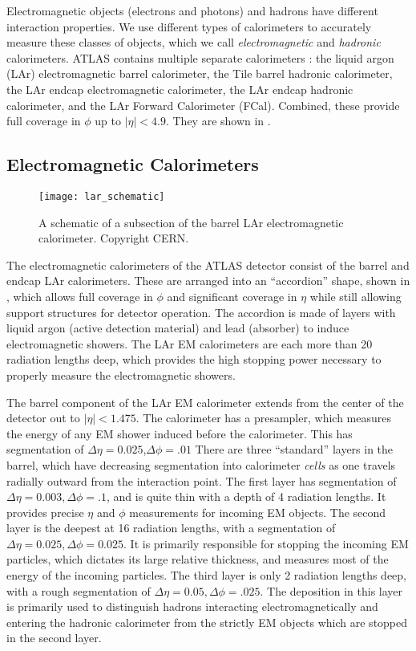 Electromagnetic objects (electrons and photons) and hadrons have different interaction properties.
We use different types of calorimeters to accurately measure these classes of objects, which we call \textit{electromagnetic} and \textit{hadronic} calorimeters.
ATLAS contains multiple separate calorimeters : the liquid argon (LAr) electromagnetic barrel calorimeter, the Tile barrel hadronic calorimeter, the LAr endcap electromagnetic calorimeter, the LAr endcap hadronic calorimeter, and the LAr Forward Calorimeter (FCal).
Combined, these provide full coverage in $\phi$ up to $|\eta| <4.9$.
They are shown in .

\subsection{Electromagnetic Calorimeters}
\begin{figure}[tbp]
\caption{A schematic of a subsection of the barrel LAr electromagnetic calorimeter. Copyright CERN.} \label{fig:lar_schematic}
\texttt{[image: lar\_schematic]}
\end{figure}

The electromagnetic calorimeters of the ATLAS detector consist of the barrel and endcap LAr calorimeters.
These are arranged into an ``accordion'' shape, shown in , which allows full coverage in $\phi$ and significant coverage in $\eta$ while still allowing support structures for detector operation.
The accordion is made of layers with liquid argon (active detection material) and lead (absorber) to induce electromagnetic showers.
The LAr EM calorimeters are each more than 20 radiation lengths deep, which provides the high stopping power necessary to properly measure the electromagnetic showers.

The barrel component of the LAr EM calorimeter extends from the center of the detector out to $| \eta| <  1.475 $.
The calorimeter has a presampler, which measures the energy of any EM shower induced before the calorimeter.
This has segmentation of $\Delta\eta = 0.025$,$ \Delta\phi = .01$
There are three ``standard'' layers in the barrel, which have decreasing segmentation into calorimeter \textit{cells} as one travels radially outward from the interaction point.
The first layer has segmentation of $\Delta\eta = 0.003, \Delta\phi = .1$, and is quite thin with a depth of 4 radiation lengths.
It provides precise $\eta$ and $\phi$ measurements for incoming EM objects.
The second layer is the deepest at 16 radiation lengths, with a segmentation of $\Delta\eta = 0.025, \Delta\phi = 0.025$.
It is primarily responsible for stopping the incoming EM particles, which dictates its large relative thickness, and measures most of the energy of the incoming particles.
The third layer is only 2 radiation lengths deep, with a rough segmentation of $\Delta\eta = 0.05, \Delta\phi = .025$.
The deposition in this layer is primarily used to distinguish hadrons interacting electromagnetically and entering the hadronic calorimeter from the strictly EM objects which are stopped in the second layer.

